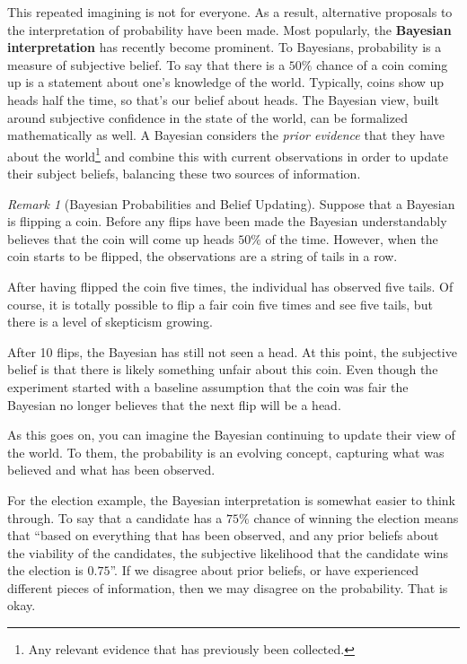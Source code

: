 \documentclass[
  letterpaper,
  DIV=11,
  numbers=noendperiod]{scrreprt}
\theoremstyle{definition}
\theoremstyle{definition}
\theoremstyle{definition}
\theoremstyle{remark}
\newtheorem*{remark}{Remark}
\begin{document}
This repeated imagining is not for everyone. As a result, alternative
proposals to the interpretation of probability have been made. Most
popularly, the \textbf{Bayesian interpretation} has recently become
prominent. To Bayesians, probability is a measure of subjective belief.
To say that there is a \(50\%\) chance of a coin coming up is a
statement about one's knowledge of the world. Typically, coins show up
heads half the time, so that's our belief about heads. The Bayesian
view, built around subjective confidence in the state of the world, can
be formalized mathematically as well. A Bayesian considers the
\emph{prior evidence} that they have about the world\footnote{Any
  relevant evidence that has previously been collected.} and combine
this with current observations in order to update their subject beliefs,
balancing these two sources of information.

\begin{remark}[Bayesian Probabilities and Belief Updating]
Suppose that a Bayesian is flipping a coin. Before any flips have been
made the Bayesian understandably believes that the coin will come up
heads \(50\%\) of the time. However, when the coin starts to be flipped,
the observations are a string of tails in a row.

After having flipped the coin five times, the individual has observed
five tails. Of course, it is totally possible to flip a fair coin five
times and see five tails, but there is a level of skepticism growing.

After 10 flips, the Bayesian has still not seen a head. At this point,
the subjective belief is that there is likely something unfair about
this coin. Even though the experiment started with a baseline assumption
that the coin was fair the Bayesian no longer believes that the next
flip will be a head.

As this goes on, you can imagine the Bayesian continuing to update their
view of the world. To them, the probability is an evolving concept,
capturing what was believed and what has been observed.
\end{remark}

For the election example, the Bayesian interpretation is somewhat easier
to think through. To say that a candidate has a \(75\%\) chance of
winning the election means that ``based on everything that has been
observed, and any prior beliefs about the viability of the candidates,
the subjective likelihood that the candidate wins the election is
\(0.75\)''. If we disagree about prior beliefs, or have experienced
different pieces of information, then we may disagree on the
probability. That is okay.
\end{document}
